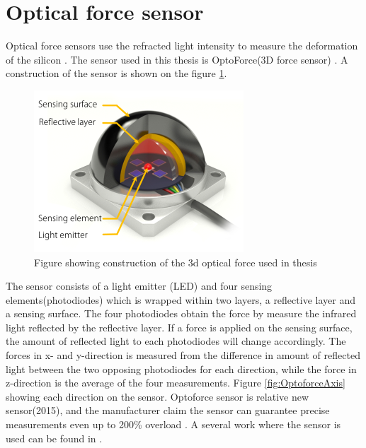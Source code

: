 \documentclass[USenglish]{ifimaster}  %
\begin{document}
\section{Optical force sensor}
Optical force sensors use the refracted light intensity to measure the deformation of the silicon \cite{6027100}\cite{6907805}. The sensor used in this thesis is OptoForce(3D force sensor) \cite{Optoforce}. A construction of the sensor is shown on the figure \ref{fig:OptoforceBuild}. 
\begin{figure}[h]
	\centering
	\includegraphics[scale=0.8]{Figures/OptoforceBuild}
	\caption{Figure showing construction of the 3d optical force used in thesis \cite{OptoforceFig}}
	\label{fig:OptoforceBuild}
\end{figure}
\FloatBarrier

The sensor consists of a light emitter (LED) and four sensing elements(photodiodes) which is wrapped within two layers, a reflective layer and a sensing surface. The four photodiodes obtain the force by measure the infrared light reflected by the reflective layer. If a force is applied on the sensing surface, the amount of reflected light to each photodiodes will change accordingly. The forces in x- and y-direction is measured from the difference in amount of reflected light between the two opposing photodiodes for each direction, while the force in z-direction is the average of the four measurements. Figure \ref{fig:OptoforceAxis} showing each direction on the sensor. Optoforce sensor is relative new sensor(2015), and the manufacturer claim the sensor can guarantee precise measurements even up to 200\% overload \cite{Optoforce2}. A several work where the sensor is used can be found in \cite{7803326,7759112,7849467}.
\end{document}
